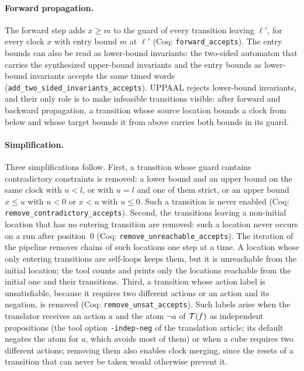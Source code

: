 \paragraph{Forward propagation.}
The forward step adds $x\ge m$ to the guard of every transition leaving
$\ell'$, for every clock $x$ with entry bound $m$ at $\ell'$ (Coq:
\texttt{forward\_\allowbreak{}accepts}).  The entry bounds can also be read as lower-bound
invariants: the two-sided automaton that carries the synthesized upper-bound
invariants and the entry bounds as lower-bound invariants accepts the same
timed words (\texttt{add\_\allowbreak{}two\_\allowbreak{}sided\_\allowbreak{}invariants\_\allowbreak{}accepts}).  UPPAAL
rejects lower-bound invariants, and their only role is to make infeasible
transitions visible: after forward and backward propagation, a transition whose
source location bounds a clock from below and whose target bounds it from above
carries both bounds in its guard.

\paragraph{Simplification.}
Three simplifications follow.  First, a transition whose guard contains
contradictory constraints is removed: a lower bound and an upper bound on the
same clock with $u<l$, or with $u=l$ and one of them strict, or an upper bound
$x\le u$ with $u<0$ or $x<u$ with $u\le0$.  Such a transition is never enabled (Coq:
\texttt{remove\_\allowbreak{}contradictory\_\allowbreak{}accepts}).  Second, the transitions
leaving a non-initial location that has no entering transition
are removed: such a location never occurs on a run after position~$0$ (Coq:
\texttt{remove\_\allowbreak{}unreachable\_\allowbreak{}accepts}).  The iteration of the pipeline
removes chains of such locations one step at a time.  A location whose only
entering transitions are self-loops keeps them, but it is unreachable from
the initial location; the tool counts and prints only the locations
reachable from the initial one and their transitions.  Third, a transition whose
action label is unsatisfiable, because it requires two different actions or an
action and its negation, is removed (Coq:
\texttt{remove\_\allowbreak{}unsat\_\allowbreak{}accepts}).  Such labels arise when the
translator receives an action $a$ and the atom $\neg a$ of $\mathcal{T}(f)$ as independent
propositions (the tool option \texttt{-indep-neg} of the translation article;
its default negates the atom for $a$, which avoids most of them) or when a cube
requires two different actions; removing them also enables clock merging, since the resets of a
transition that can never be taken would otherwise prevent it.


